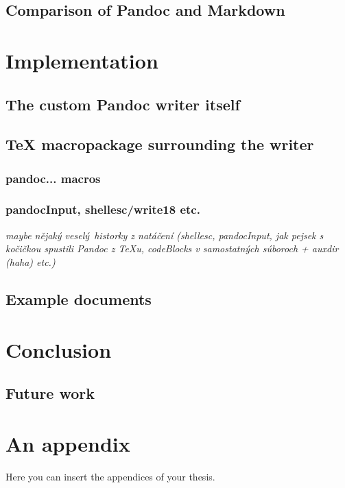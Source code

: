 \documentclass[
  digital,     %
  oneside,     %
  nosansbold,  %
  nocolorbold, %
  lof,         %
  lot,         %
]{fithesis4}
\begin{document}
\section{Comparison of Pandoc and Markdown}

\chapter{Implementation}
\section{The custom Pandoc writer itself}
\section{\TeX{} macropackage surrounding the writer}
\subsection{pandoc... macros}
\subsection{pandocInput, shellesc/write18 etc.}
\emph{maybe nějaký veselý historky z natáčení (shellesc, pandocInput, jak pejsek s kočičkou spustili Pandoc z TeXu, codeBlocks v samostatných súboroch + auxdir (haha) etc.)}
\section{Example documents}

\chapter{Conclusion}
\section{Future work}

\printbibliography[heading=bibintoc] %

\makeatletter\thesis@blocks@clear\makeatother
{} %
\printindex

\appendix %
\chapter{An appendix}
Here you can insert the appendices of your thesis.
\end{document}
